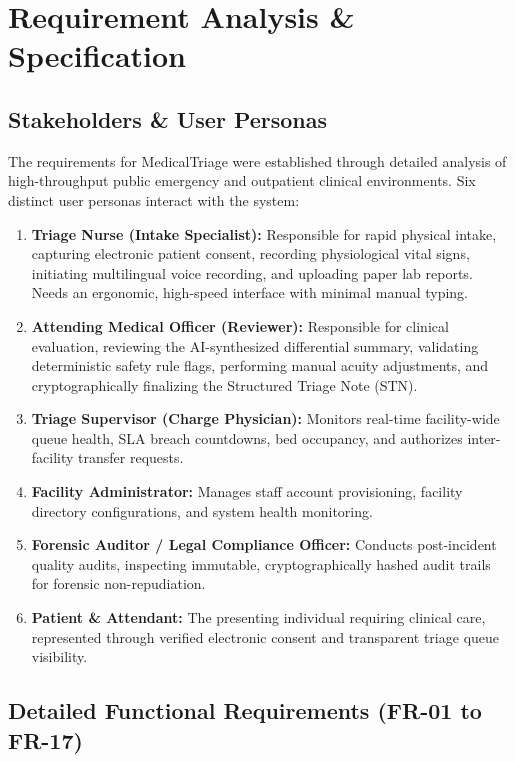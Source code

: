 \documentclass[11pt,a4paper,oneside]{report}
\begin{document}
\chapter{Requirement Analysis \& Specification}

\section{Stakeholders \& User Personas}
The requirements for MedicalTriage were established through detailed analysis of high-throughput public emergency and outpatient clinical environments. Six distinct user personas interact with the system:
\begin{enumerate}[leftmargin=20pt]
  \item \textbf{Triage Nurse (Intake Specialist):} Responsible for rapid physical intake, capturing electronic patient consent, recording physiological vital signs, initiating multilingual voice recording, and uploading paper lab reports. Needs an ergonomic, high-speed interface with minimal manual typing.
  \item \textbf{Attending Medical Officer (Reviewer):} Responsible for clinical evaluation, reviewing the AI-synthesized differential summary, validating deterministic safety rule flags, performing manual acuity adjustments, and cryptographically finalizing the Structured Triage Note (STN).
  \item \textbf{Triage Supervisor (Charge Physician):} Monitors real-time facility-wide queue health, SLA breach countdowns, bed occupancy, and authorizes inter-facility transfer requests.
  \item \textbf{Facility Administrator:} Manages staff account provisioning, facility directory configurations, and system health monitoring.
  \item \textbf{Forensic Auditor / Legal Compliance Officer:} Conducts post-incident quality audits, inspecting immutable, cryptographically hashed audit trails for forensic non-repudiation.
  \item \textbf{Patient \& Attendant:} The presenting individual requiring clinical care, represented through verified electronic consent and transparent triage queue visibility.
\end{enumerate}

\section{Detailed Functional Requirements (FR-01 to FR-17)}
\end{document}
